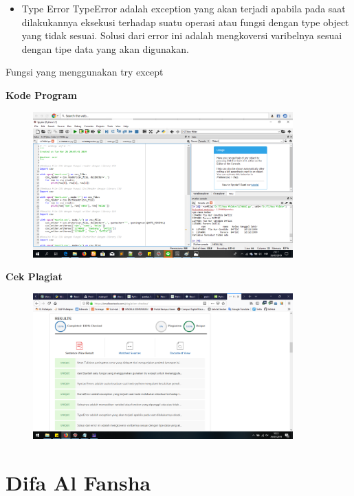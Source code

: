 \begin{enumerate}
\begin{itemize}
		\item Type Error
		TypeError adalah exception yang akan terjadi apabila pada saat dilakukannya eksekusi terhadap suatu operasi atau fungsi dengan type object yang tidak sesuai. Solusi dari error ini adalah mengkoversi varibelnya sesuai dengan tipe data yang akan digunakan.
	\end{itemize}
	
	Fungsi yang menggunakan try except
	
\end{enumerate}

\textbf{Kode Program}
\begin{figure}[H]
	\includegraphics[width=10cm]{figures/4/1174086/p1.png}
	\centering
\end{figure}

\textbf{Cek Plagiat}
\begin{figure}[H]
	\includegraphics[width=10cm]{figures/4/1174086/plagiatpenanganan.png}
	\centering
\end{figure}



\section{Difa Al Fansha}
